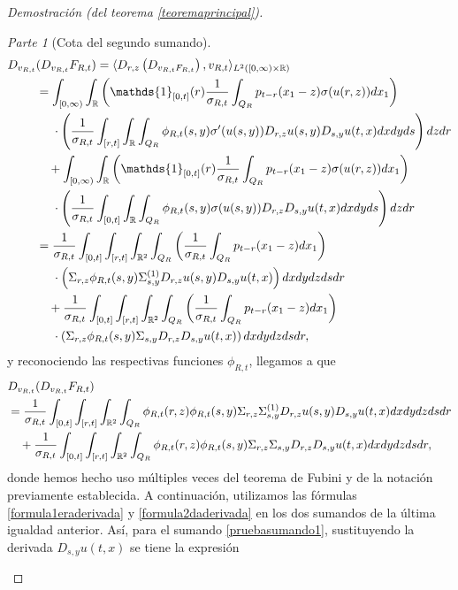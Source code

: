 \documentclass[letterpaper,twoside,12pt]{book}
\newcommand{\R}{\mathbb{R}}
\newcommand{\1}{\mathds{1}}
\theoremstyle{definition}
\theoremstyle{definition}
\theoremstyle{remark}
\newtheorem{proofpart}{Parte}
\theoremstyle{definition}
\theoremstyle{definition}
\theoremstyle{definition}
\theoremstyle{definition}
\theoremstyle{definition}
\begin{document}
\begin{proof}[Demostración (del teorema \ref{teoremaprincipal})]
\begin{proofpart}[Cota del segundo sumando]
\begin{align}
   D_{v_{R,t}}&(D_{v_{R,t}}F_{R,t})=\langle D_{r,z}\left(D_{v_{R,t}F_{R,t}}\right),v_{R,t}\rangle_{L^{2}([0,\infty)\times\R)}\notag\\
   &=\int_{[0,\infty)}\int_\R \left(\1_{[0,t]}(r)\frac{1}{\sigma_{R,t}}\int_{Q_R}p_{t-r}(x_1-z)\sigma(u(r,z))dx_1\right)\notag\\
   &\ \ \ \ \cdot \left(\frac{1}{\sigma_{R,t}}\int_{[r,t]}\int_\R \int_{Q_R}\phi_{R,t}(s,y)\sigma'(u(s,y))D_{r,z}u(s,y)D_{s,y}u(t,x)dx dy ds\right)dz dr\notag\\
   &\ \ \ +\int_{[0,\infty)}\int_\R \left(\1_{[0,t]}(r)\frac{1}{\sigma_{R,t}}\int_{Q_R}p_{t-r}(x_1-z)\sigma(u(r,z))dx_1\right)\notag\\
   &\ \ \ \ \cdot\left(\frac{1}{\sigma_{R,t}}\int_{[0,t]}\int_\R \int_{Q_R}\phi_{R,t}(s,y)\sigma(u(s,y))D_{r,z}D_{s,y}u(t,x)dx dy ds\right)dz dr\notag\\
   &=\frac{1}{\sigma_{R,t}}\int_{[0,t]}\int_{[r,t]}\int_{\R^2}\int_{Q_R}\left(\frac{1}{\sigma_{R,t}}\int_{Q_R}p_{t-r}(x_1-z)dx_1\right)\notag\\
   &\ \ \ \ \cdot \left(\Sigma_{r,z}\phi_{R,t}(s,y)\Sigma^{(1)}_{s,y}D_{r,z}u(s,y)D_{s,y}u(t,x)\right) dx dy dz ds dr\notag\\
   &\ \ \ +\frac{1}{\sigma_{R,t}}\int_{[0,t]}\int_{[r,t]}\int_{\R^2}\int_{Q_R} \left(\frac{1}{\sigma_{R,t}}\int_{Q_R}p_{t-r}(x_1-z)dx_1\right)\notag\\
   &\ \ \ \ \cdot\left(\Sigma_{r,z}\phi_{R,t}(s,y)\Sigma_{s,y}D_{r,z}D_{s,y}u(t,x)\right)dx dy dz ds dr,\notag
   \end{align}
   y reconociendo las respectivas funciones $\phi_{R,t}$, llegamos a que 
   \begin{align}
      &D_{v_{R,t}}(D_{v_{R,t}}F_{R,t})\notag\\
      &=\frac{1}{\sigma_{R,t}}\int_{[0,t]}\int_{[r,t]}\int_{\R^2}\int_{Q_R}\phi_{R,t}(r,z)\phi_{R,t}(s,y)\Sigma_{r,z}\Sigma^{(1)}_{s,y}D_{r,z}u(s,y)D_{s,y}u(t,x)dx dy dz ds dr\label{pruebasumando1}\\ 
   &\ \ \ +\frac{1}{\sigma_{R,t}}\int_{[0,t]}\int_{[r,t]}\int_{\R^2}\int_{Q_R}\phi_{R,t}(r,z)\phi_{R,t}(s,y)\Sigma_{r,z}\Sigma_{s,y}D_{r,z}D_{s,y}u(t,x)dx dy dz ds dr,\label{pruebasumando2}
\end{align}
   donde hemos hecho uso múltiples veces del teorema de Fubini y de la notación previamente establecida. A continuación, utilizamos las fórmulas \eqref{formula1eraderivada} y \eqref{formula2daderivada} en los dos sumandos de la última igualdad anterior. Así, para el sumando \eqref{pruebasumando1}, sustituyendo la derivada $D_{s,y}u(t,x)$ se tiene la expresión

\end{proofpart}
\end{proof}
\end{document}
